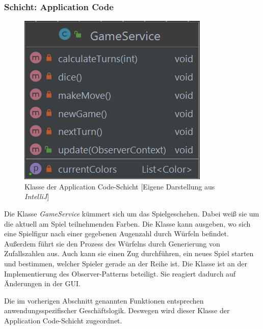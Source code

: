 \subsubsection{Schicht: Application Code}
\begin{figure}[htbp]
\centering
\centerline{\includegraphics[scale=.42]{gameservice}}
\caption{Klasse der Application Code-Schicht [Eigene Darstellung aus \emph{IntelliJ}]}
\label{fig:klasseapplicationcodeschicht}
\end{figure}
\noindent Die Klasse \emph{GameService} kümmert sich um das Spielgeschehen. Dabei weiß sie um die aktuell am Spiel teilnehmenden Farben. Die Klasse kann ausgeben, wo sich eine Spielfigur nach einer gegebenen Augenzahl durch Würfeln befindet. Außerdem führt sie den Prozess des Würfelns durch Generierung von Zufallszahlen aus. Auch kann sie einen Zug durchführen, ein neues Spiel starten und bestimmen, welcher Spieler gerade an der Reihe ist. Die Klasse ist an der Implementierung des Observer-Patterns beteiligt. Sie reagiert dadurch auf Änderungen in der \acs{GUI}.

Die im vorherigen Abschnitt genannten Funktionen entsprechen anwendungsspezifischer Geschäftslogik. Deswegen wird dieser Klasse der Application Code-Schicht zugeordnet.